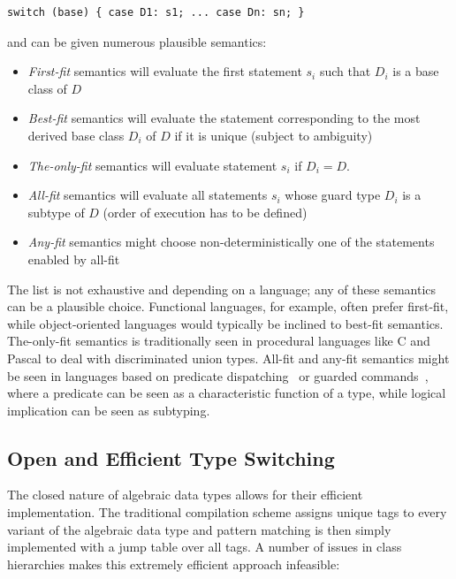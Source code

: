 \begin{lstlisting}[keepspaces]
switch (base) { case D1: s1; ... case Dn: sn; }
\end{lstlisting}

\noindent and can be given numerous plausible semantics:

\begin{itemize}
\setlength{\itemsep}{0pt}
\setlength{\parskip}{0pt}
\item \emph{First-fit} semantics will evaluate the first statement $s_i$ such 
      that $D_i$ is a base class of $D$
\item \emph{Best-fit} semantics will evaluate the statement corresponding to the 
      most derived base class $D_i$ of $D$ if it is unique (subject to 
      ambiguity)
\item \emph{The-only-fit} semantics will evaluate statement $s_i$ if $D_i=D$.
\item \emph{All-fit} semantics will evaluate all statements $s_i$ whose guard 
      type $D_i$ is a subtype of $D$ (order of execution has to be defined)
\item \emph{Any-fit} semantics might choose non-deterministically one of the 
      statements enabled by all-fit
\end{itemize}

\noindent
The list is not exhaustive and depending on a language; any of these semantics can be a plausible choice. Functional languages, for 
example, often prefer first-fit, while object-oriented languages would typically 
be inclined to best-fit semantics. The-only-fit semantics is traditionally seen 
in procedural languages like C and Pascal to deal with discriminated union types. 
All-fit and any-fit semantics might be seen in languages based on predicate 
dispatching~\cite{ErnstKC98} or guarded commands~\cite{EWD:EWD472}, where a 
predicate can be seen as a characteristic function of a type, while logical 
implication can be seen as subtyping.

\subsection{Open and Efficient Type Switching}
\label{sec:poets}

The closed nature of algebraic data types allows for 
their efficient implementation. 
The traditional compilation scheme assigns unique 
tags to every variant of the algebraic data type and pattern matching is then 
simply implemented with a jump table over all tags. A number of issues in 
class hierarchies makes this extremely efficient approach infeasible:

